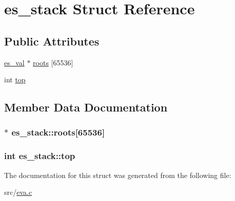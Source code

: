 \hypertarget{structes__stack}{\section{es\-\_\-stack Struct Reference}
\label{structes__stack}
}
\subsection*{Public Attributes}
\begin{DoxyCompactItemize}
\item 
\hyperlink{eva_8h_a8333c63b2093a13aab6d419c87680d7f}{es\-\_\-val} $\ast$ \hyperlink{structes__stack_a62afa5a446c842e489ca2902ed1729ec}{roots} \mbox{[}65536\mbox{]}
\item 
int \hyperlink{structes__stack_a47f6a4f03f9d776d90d7a2e279d912af}{top}
\end{DoxyCompactItemize}


\subsection{Member Data Documentation}
\hypertarget{structes__stack_a62afa5a446c842e489ca2902ed1729ec}{
\subsubsection[{roots}]{$\ast$ es\-\_\-stack\-::roots\mbox{[}65536\mbox{]}}}\label{structes__stack_a62afa5a446c842e489ca2902ed1729ec}
\hypertarget{structes__stack_a47f6a4f03f9d776d90d7a2e279d912af}{
\subsubsection[{top}]{\setlength{\rightskip}{0pt plus 5cm}int es\-\_\-stack\-::top}}\label{structes__stack_a47f6a4f03f9d776d90d7a2e279d912af}


The documentation for this struct was generated from the following file\-:\begin{DoxyCompactItemize}
\item 
src/\hyperlink{eva_8c}{eva.\-c}\end{DoxyCompactItemize}
